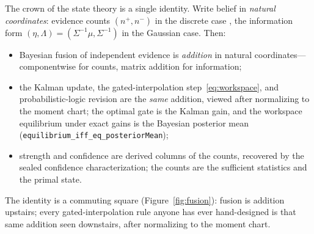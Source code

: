 \documentclass[11pt]{article}
\newcommand{\code}[1]{\texttt{#1}}
\begin{document}
The crown of the state theory is a single identity. Write belief in \emph{natural
coordinates}: evidence counts $(n^{+},n^{-})$ in the discrete case
\cite{pln2009}, the information form $(\eta,\Lambda)=(\Sigma^{-1}\mu,\Sigma^{-1})$ in
the Gaussian case. Then:
\begin{itemize}
\item Bayesian fusion of independent evidence is \emph{addition} in natural
coordinates---componentwise for counts, matrix addition for information;
\item the Kalman update, the gated-interpolation step~\eqref{eq:workspace}, and
probabilistic-logic revision are the \emph{same} addition, viewed after normalizing to
the moment chart; the optimal gate is the Kalman gain, and the workspace equilibrium
under exact gains is the Bayesian posterior mean
(\code{equilibrium\_iff\_eq\_posteriorMean});
\item strength and confidence are derived columns of the counts, recovered by the
sealed confidence characterization; the counts are the sufficient statistics and the
primal state.
\end{itemize}
The identity is a commuting square (Figure~\ref{fig:fusion}): fusion is addition
upstairs; every gated-interpolation rule anyone has ever hand-designed is that same
addition seen downstairs, after normalizing to the moment chart.
\end{document}
